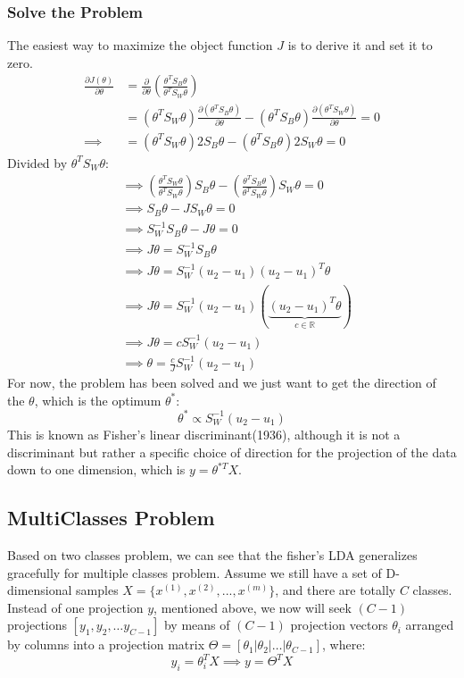 \documentclass[a4paper]{article}
\begin{document}
\subsubsection{Solve the Problem}
The easiest way to maximize the object function $J$ is to derive it and set it to zero.
\begin{align*}
	\frac {\partial J(\theta)}{\partial \theta} &= \frac {\partial } {\partial \theta} (\frac{\theta^T S_B \theta} {\theta^T S_W \theta}) \\
	&= (\theta^T S_W \theta) \frac{\partial (\theta^T S_B \theta)} {\partial \theta} - (\theta^T S_B \theta) \frac {\partial (\theta^T S_W \theta)} {\partial \theta} = 0 \\
	\implies &= (\theta^T S_W \theta) 2 S_B \theta - (\theta^T S_B \theta) 2 S_W \theta = 0
\end{align*}
Divided by $\theta^T S_W \theta:$ 
\begin{align*}
	&\implies (\frac{\theta^T S_W \theta} {\theta^T S_W \theta})S_B\theta - (\frac{\theta^T S_B \theta} {\theta^T S_W \theta})S_W \theta = 0 \\
	&\implies S_B \theta - J S_W \theta = 0 \\
	&\implies S^{-1}_W S_B \theta - J\theta = 0 \\
	&\implies  J\theta = S^{-1}_W S_B \theta  \\
	&\implies  J\theta = S^{-1}_W (u_2 - u_1)(u_2 - u_1)^T \theta  \\
	&\implies  J\theta = S^{-1}_W (u_2 - u_1) (\underbrace{(u_2 - u_1)^T \theta}_{c \in \mathbb{R}})  \\
	&\implies  J\theta = c S^{-1}_W(u_2 - u_1)   \\
	&\implies \theta = \frac{c}{J} S^{-1}_W(u_2 - u_1)
\end{align*}
For now, the problem has been solved and we just want to get the direction of the $\theta$, which is the optimum $ \theta^\ast$:
$$
	\theta^{\ast}  \propto S^{-1}_W(u_2 - u_1)
$$
This is known as Fisher's linear discriminant(1936), although it is not a discriminant but rather a specific choice of direction for the projection of the data down to one dimension, which is $y = \theta^{\ast T}X$. 

\subsection{MultiClasses  Problem}
Based on two classes problem, we can see that the fisher's LDA generalizes gracefully for multiple classes problem. Assume we still have a set of D-dimensional samples $X = \{x^{(1)}, x^{(2)}, ... , x^{(m)} \}$, and there are totally $C$ classes. Instead of one projection $y$, mentioned above, we now will seek $(C-1)$ projections $[y_1, y_2, \dots y_{C-1}]$ by means of $(C-1)$ projection vectors $\theta_i$ arranged by columns into a projection matrix $\Theta = [\theta_1 | \theta_2 | \dots | \theta_{C-1}]$, where: 
$$
	y_i  = \theta_i^{T}X 
	\implies y = \Theta^T X
$$
\end{document}
